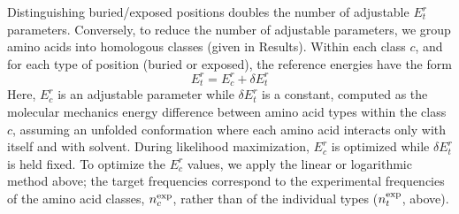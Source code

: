 \documentclass[12pt]{article}
\begin{document}
Distinguishing buried/exposed positions doubles the number of adjustable $E^r_t$ parameters. Conversely, to reduce the
number of adjustable parameters, we group amino acids into homologous classes (given in Results). Within each class
$c$, and for each type of position (buried or exposed), the reference energies have the form
\begin{equation}
E^r_t = E^r_c + \delta E^r_t
\end{equation}
Here, $E^r_c$ is an adjustable parameter while $\delta E^r_t$ is a constant, computed as the molecular mechanics energy
difference between amino acid types within the class $c$, assuming an unfolded conformation where each amino acid interacts
only with itself and with solvent. During likelihood maximization, $E^r_c$ is optimized while $\delta E^r_t$ is held fixed.
To optimize the $E^r_c$ values, we apply the linear or logarithmic method above; the target frequencies correspond to the
experimental frequencies of the amino acid classes, $n_c^{\rm exp}$, rather than of the individual types ($n_t^{\rm exp}$, above).
\end{document}
